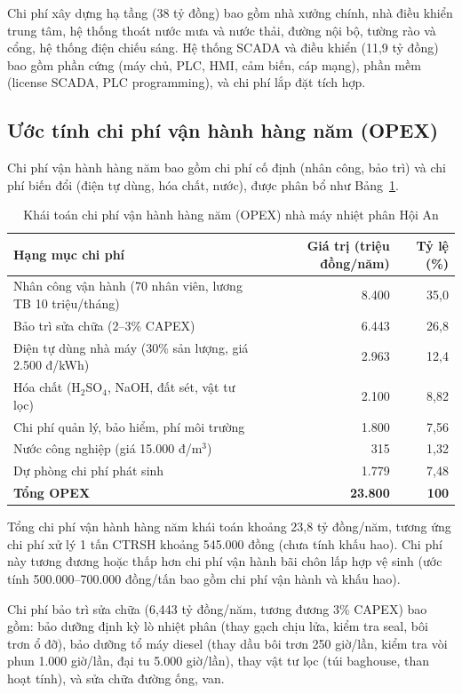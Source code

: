 \documentclass[../main.tex]{subfiles}
\begin{document}
Chi phí xây dựng hạ tầng (38 tỷ đồng) bao gồm nhà xưởng chính, nhà điều khiển trung tâm, hệ thống thoát nước mưa và nước thải, đường nội bộ, tường rào và cổng, hệ thống điện chiếu sáng. Hệ thống SCADA và điều khiển (11,9 tỷ đồng) bao gồm phần cứng (máy chủ, PLC, HMI, cảm biến, cáp mạng), phần mềm (license SCADA, PLC programming), và chi phí lắp đặt tích hợp.

\subsection{Ước tính chi phí vận hành hàng năm (OPEX)}

Chi phí vận hành hàng năm bao gồm chi phí cố định (nhân công, bảo trì) và chi phí biến đổi (điện tự dùng, hóa chất, nước), được phân bổ như Bảng~\ref{tab:khai-toan-opex}.

\begin{table}[H]
\caption{Khái toán chi phí vận hành hàng năm (OPEX) nhà máy nhiệt phân Hội An}
\label{tab:khai-toan-opex}
\centering
\begin{tabular}{p{6.5cm} r r}
\toprule
\textbf{Hạng mục chi phí} & \textbf{Giá trị (triệu đồng/năm)} & \textbf{Tỷ lệ (\%)} \\
\midrule
Nhân công vận hành (70 nhân viên, lương TB 10 triệu/tháng) & 8.400 & 35,0 \\
Bảo trì sửa chữa (2--3\% CAPEX) & 6.443 & 26,8 \\
Điện tự dùng nhà máy (30\% sản lượng, giá 2.500 đ/kWh) & 2.963 & 12,4 \\
Hóa chất (H$_2$SO$_4$, NaOH, đất sét, vật tư lọc) & 2.100 & 8,82 \\
Chi phí quản lý, bảo hiểm, phí môi trường & 1.800 & 7,56 \\
Nước công nghiệp (giá 15.000 đ/m$^3$) & 315 & 1,32 \\
Dự phòng chi phí phát sinh & 1.779 & 7,48 \\
\midrule
\textbf{Tổng OPEX} & \textbf{23.800} & \textbf{100} \\
\bottomrule
\end{tabular}
\end{table}

Tổng chi phí vận hành hàng năm khái toán khoảng 23,8 tỷ đồng/năm, tương ứng chi phí xử lý 1 tấn CTRSH khoảng 545.000 đồng (chưa tính khấu hao). Chi phí này tương đương hoặc thấp hơn chi phí vận hành bãi chôn lấp hợp vệ sinh (ước tính 500.000--700.000 đồng/tấn bao gồm chi phí vận hành và khấu hao).

Chi phí bảo trì sửa chữa (6,443 tỷ đồng/năm, tương đương 3\% CAPEX) bao gồm: bảo dưỡng định kỳ lò nhiệt phân (thay gạch chịu lửa, kiểm tra seal, bôi trơn ổ đỡ), bảo dưỡng tổ máy diesel (thay dầu bôi trơn 250 giờ/lần, kiểm tra vòi phun 1.000 giờ/lần, đại tu 5.000 giờ/lần), thay vật tư lọc (túi baghouse, than hoạt tính), và sửa chữa đường ống, van.
\end{document}
